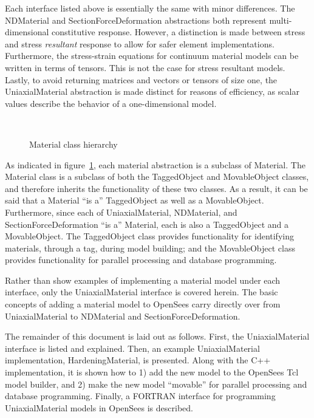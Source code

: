 \documentclass[12pt]{article}
\begin{document}
\noindent Each interface listed above is essentially the same with minor differences.
The NDMaterial and SectionForceDeformation abstractions both represent multi-dimensional
constitutive response. However, a distinction is made between stress and stress
{\em resultant} response to allow for safer element implementations. Furthermore, the
stress-strain equations for continuum material models can be written in terms of
tensors. This is not the case for stress resultant models. Lastly, to avoid returning
matrices and vectors or tensors of size one, the UniaxialMaterial abstraction is
made distinct for reasons of efficiency, as scalar values describe the behavior
of a one-dimensional model.

\begin{figure}[htpb]
\begin{center}
\leavevmode
\hbox{%
}
\end{center}
\caption{Material class hierarchy}
\label{fig:Material}
\end{figure}

As indicated in figure~\ref{fig:Material}, each material abstraction is a subclass of
Material. The Material class is a subclass of both
the TaggedObject and MovableObject classes, and therefore inherits the functionality
of these two classes. As a result, it can be said that a
Material ``is a'' TaggedObject as well as a MovableObject. Furthermore, since each of
UniaxialMaterial, NDMaterial, and SectionForceDeformation ``is a'' Material, each is
also a TaggedObject and a MovableObject. The TaggedObject class provides functionality
for identifying materials, through a tag, during model building; and the MovableObject
class provides functionality for parallel processing and database programming.

Rather than show examples of implementing a material model under each interface, only the
UniaxialMaterial interface is covered herein. The basic concepts of adding a material
model to OpenSees carry directly over from UniaxialMaterial
to NDMaterial and SectionForceDeformation.

The remainder of this document is laid out as follows. First, the UniaxialMaterial
interface is listed and explained. Then, an example UniaxialMaterial
implementation, HardeningMaterial, is presented. Along with the C++ implementation,
it is shown how to 1) add the new model to the OpenSees Tcl model builder, and 2)
make the new model ``movable'' for parallel processing and database programming.
Finally, a FORTRAN interface for programming UniaxialMaterial models in OpenSees
is described.
\end{document}
